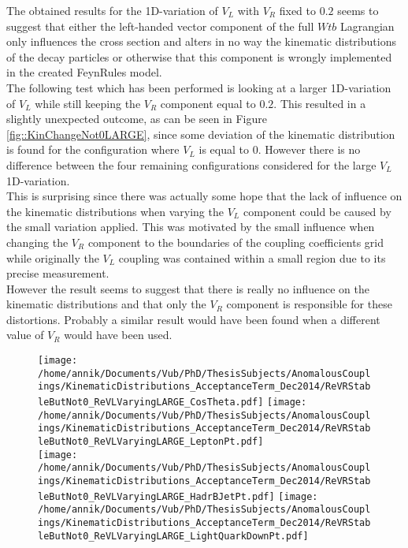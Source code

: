The obtained results for the 1D-variation of $V_L$ with $V_R$ fixed to $0.2$ seems to suggest that either the left-handed vector component of the full $Wtb$ Lagrangian only influences the cross section and alters in no way the kinematic distributions of the decay particles or otherwise that this component is wrongly implemented in the created FeynRules model. \\
The following test which has been performed is looking at a larger 1D-variation of $V_L$ while still keeping the $V_R$ component equal to $0.2$. This resulted in a slightly unexpected outcome, as can be seen in Figure \ref{fig::KinChangeNot0LARGE}, since some deviation of the kinematic distribution is found for the configuration where $V_L$ is equal to $0$. However there is no difference between the four remaining configurations considered for the large $V_L$ 1D-variation.\\
This is surprising since there was actually some hope that the lack of influence on the kinematic distributions when varying the $V_L$ component could be caused by the small variation applied. This was motivated by the small influence when changing the $V_R$ component to the boundaries of the coupling coefficients grid while originally the $V_L$ coupling was contained within a small region due to its precise measurement.\\
However the result seems to suggest that there is really no influence on the kinematic distributions and that only the $V_R$ component is responsible for these distortions. Probably a similar result would have been found when a different value of $V_R$ would have been used.
\begin{figure}[!h]
 \centering
 \texttt{[image: /home/annik/Documents/Vub/PhD/ThesisSubjects/AnomalousCouplings/KinematicDistributions\_AcceptanceTerm\_Dec2014/ReVRStableButNot0\_ReVLVaryingLARGE\_CosTheta.pdf]}
 \texttt{[image: /home/annik/Documents/Vub/PhD/ThesisSubjects/AnomalousCouplings/KinematicDistributions\_AcceptanceTerm\_Dec2014/ReVRStableButNot0\_ReVLVaryingLARGE\_LeptonPt.pdf]}\\
 \texttt{[image: /home/annik/Documents/Vub/PhD/ThesisSubjects/AnomalousCouplings/KinematicDistributions\_AcceptanceTerm\_Dec2014/ReVRStableButNot0\_ReVLVaryingLARGE\_HadrBJetPt.pdf]}
 \texttt{[image: /home/annik/Documents/Vub/PhD/ThesisSubjects/AnomalousCouplings/KinematicDistributions\_AcceptanceTerm\_Dec2014/ReVRStableButNot0\_ReVLVaryingLARGE\_LightQuarkDownPt.pdf]}
 \caption{}
 \label{fig::KinChangeNot0}
\end{figure}

